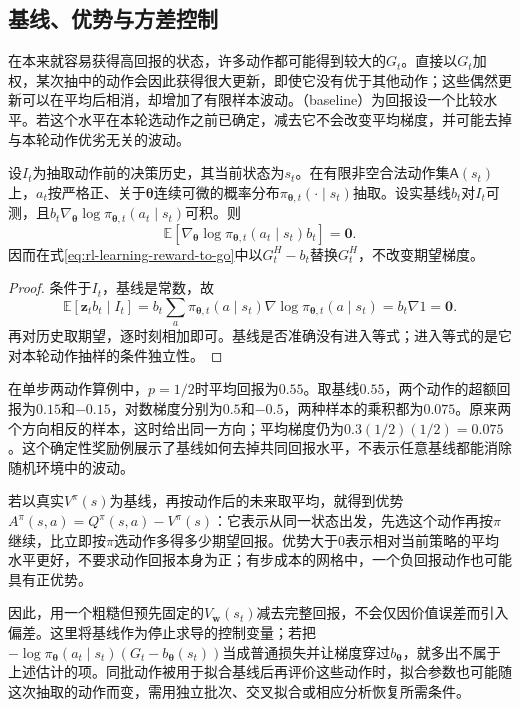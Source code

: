 \subsection{基线、优势与方差控制}
\label{sec:rl-learning-baseline}

在本来就容易获得高回报的状态，许多动作都可能得到较大的$G_t$。直接以$G_t$加权，某次抽中的动作会因此获得很大更新，即使它没有优于其他动作；这些偶然更新可以在平均后相消，却增加了有限样本波动。（baseline）为回报设一个比较水平。若这个水平在本轮选动作之前已确定，减去它不会改变平均梯度，并可能去掉与本轮动作优劣无关的波动。

\begin{theorem}[动作抽样前基线的零均值性质]
  \label{thm:rl-learning-baseline}
  设$I_t$为抽取动作前的决策历史，其当前状态为$s_t$。在有限非空合法动作集$\mathsf A(s_t)$上，$a_t$按严格正、关于$\bm\theta$连续可微的概率分布$\pi_{\bm\theta,t}(\cdot\mid s_t)$抽取。设实基线$b_t$对$I_t$可测，且$b_t\nabla_{\bm\theta}\log\pi_{\bm\theta,t}(a_t\mid s_t)$可积。则
  \[
    \mathbb E[\nabla_{\bm\theta}
       \log\pi_{\bm\theta,t}(a_t\mid s_t)b_t]=\bm0.
  \]
  因而在式\eqref{eq:rl-learning-reward-to-go}中以$G_t^H-b_t$替换$G_t^H$，不改变期望梯度。
\end{theorem}
\begin{proof}
  条件于$I_t$，基线是常数，故
  \[
    \mathbb E[\bm{z}_t b_t\mid I_t]
      =b_t\sum_a\pi_{\bm\theta,t}(a\mid s_t)
                    \nabla\log\pi_{\bm\theta,t}(a\mid s_t)
      =b_t\nabla 1=\bm0.
  \]
  再对历史取期望，逐时刻相加即可。基线是否准确没有进入等式；进入等式的是它对本轮动作抽样的条件独立性。
\end{proof}

在单步两动作算例中，$p=1/2$时平均回报为$0.55$。取基线$0.55$，两个动作的超额回报为$0.15$和$-0.15$，对数梯度分别为$0.5$和$-0.5$，两种样本的乘积都为$0.075$。原来两个方向相反的样本，这时给出同一方向；平均梯度仍为$0.3(1/2)(1/2)=0.075$。这个确定性奖励例展示了基线如何去掉共同回报水平，不表示任意基线都能消除随机环境中的波动。

若以真实$V^\pi(s)$为基线，再按动作后的未来取平均，就得到优势$A^\pi(s,a)=Q^\pi(s,a)-V^\pi(s)$：它表示从同一状态出发，先选这个动作再按$\pi$继续，比立即按$\pi$选动作多得多少期望回报。优势大于0表示相对当前策略的平均水平更好，不要求动作回报本身为正；有步成本的网格中，一个负回报动作也可能具有正优势。

因此，用一个粗糙但预先固定的$V_{\bm w}(s_t)$减去完整回报，不会仅因价值误差而引入偏差。这里将基线作为停止求导的控制变量；若把$-\log\pi_{\bm\theta}(a_t\mid s_t)(G_t-b_{\bm\theta}(s_t))$当成普通损失并让梯度穿过$b_{\bm\theta}$，就多出不属于上述估计的项。同批动作被用于拟合基线后再评价这些动作时，拟合参数也可能随这次抽取的动作而变，需用独立批次、交叉拟合或相应分析恢复所需条件。

